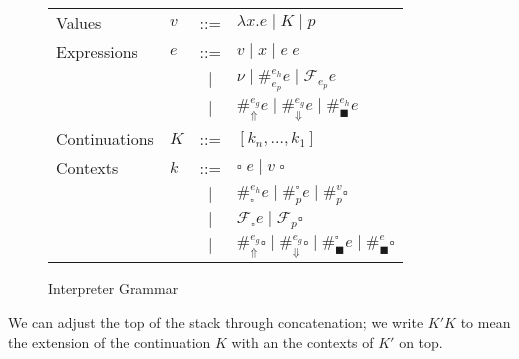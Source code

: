 \documentclass[11pt]{article}
\newcommand\F{\mathcal{F}}
\begin{document}
\begin{figure}[H]
\caption{Interpreter Grammar}
\label{fig:startGrammar}

\begin{tabular}{llcl}
Values & $v$ & ::= & $\lambda x.e \mid K \mid p$ \\
Expressions & $e$ & ::= & $v \mid x \mid e\;e$ \\
& & $|$ & $\nu \mid \#_{e_p}^{e_h}e \mid \F_{e_p}e$ \\
& & $|$ & $\#_\Uparrow^{e_g}e
    \mid   \#_\Downarrow^{e_g}e
    \mid   \#_\blacksquare^{e_h}e$ \\
Continuations & $K$ & ::= & $[k_n, \ldots, k_1]$ \\
Contexts & $k$ &
     ::= & $\square\;e
     \mid  v\;\square$ \\
& & $|$ & $\#_\square^{e_h} e
    \mid   \#_p^\square e
    \mid   \#_p^v \square$ \\
& & $|$ & $\F_\square e
    \mid   \F_p \square$ \\
& & $|$ & $\#_\Uparrow^{e_g}\square
    \mid   \#_\Downarrow^{e_g}\square
    \mid   \#_\blacksquare^\square e
    \mid   \#_\blacksquare^e\square$ \\
\end{tabular}
\end{figure}





We can adjust the top of the stack through concatenation; we write $K'K$ to mean the extension of the continuation $K$ with an the contexts of $K'$ on top.
\end{document}

